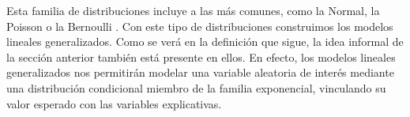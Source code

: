 
Esta familia de distribuciones incluye a las más comunes, como la Normal, la Poisson o la Bernoulli \parencite{Nieto16}. Con este tipo de distribuciones construimos los modelos lineales generalizados. Como se verá en la definición que sigue, la idea informal de la sección anterior también está presente en ellos. En efecto, los modelos lineales generalizados nos permitirán modelar una variable aleatoria de interés mediante una distribución condicional miembro de la familia exponencial, vinculando su valor esperado con las variables explicativas.


